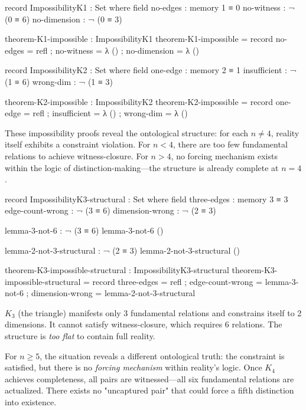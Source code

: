 \documentclass[11pt,a4paper]{book}
\begin{document}
\begin{code}
record ImpossibilityK1 : Set where
  field
    no-edges      : memory 1 ≡ 0
    no-witness    : ¬ (0 ≡ 6)
    no-dimension  : ¬ (0 ≡ 3)

theorem-K1-impossible : ImpossibilityK1
theorem-K1-impossible = record
  { no-edges     = refl
  ; no-witness   = λ ()
  ; no-dimension = λ ()
  }

record ImpossibilityK2 : Set where
  field
    one-edge      : memory 2 ≡ 1
    insufficient  : ¬ (1 ≡ 6)
    wrong-dim     : ¬ (1 ≡ 3)

theorem-K2-impossible : ImpossibilityK2
theorem-K2-impossible = record
  { one-edge     = refl
  ; insufficient = λ ()
  ; wrong-dim    = λ ()
  }
\end{code}

These impossibility proofs reveal the ontological structure: for each $n \neq 4$, reality itself exhibits a constraint violation. 
For $n < 4$, there are too few fundamental relations to achieve witness-closure.
For $n > 4$, no forcing mechanism exists within the logic of distinction-making—the structure is already complete at $n = 4$.

\begin{code}
record ImpossibilityK3-structural : Set where
  field
    three-edges     : memory 3 ≡ 3
    edge-count-wrong : ¬ (3 ≡ 6)
    dimension-wrong  : ¬ (2 ≡ 3)

lemma-3-not-6 : ¬ (3 ≡ 6)
lemma-3-not-6 ()

lemma-2-not-3-structural : ¬ (2 ≡ 3)
lemma-2-not-3-structural ()

theorem-K3-impossible-structural : ImpossibilityK3-structural
theorem-K3-impossible-structural = record
  { three-edges      = refl
  ; edge-count-wrong = lemma-3-not-6
  ; dimension-wrong  = lemma-2-not-3-structural
  }
\end{code}

$K_3$ (the triangle) manifests only 3 fundamental relations and constrains itself to 2 dimensions. It cannot satisfy witness-closure, which requires 6 relations. The structure is \emph{too flat} to contain full reality.

For $n \geq 5$, the situation reveals a different ontological truth: the constraint is satisfied, but there is no \emph{forcing mechanism} within reality's logic. Once $K_4$ achieves completeness, all pairs are witnessed—all six fundamental relations are actualized. There exists no "uncaptured pair" that could force a fifth distinction into existence.
\end{document}
